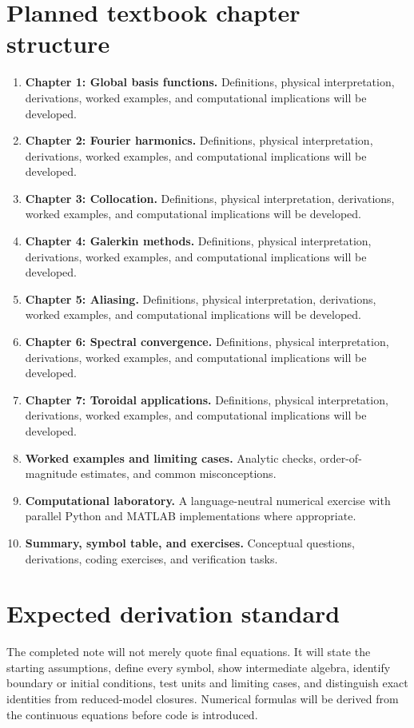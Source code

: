 \documentclass[11pt]{article}
\begin{document}
\section{Planned textbook chapter structure}
\begin{enumerate}[leftmargin=1.8em]
\item \textbf{Chapter 1: Global basis functions.} Definitions, physical interpretation, derivations, worked examples, and computational implications will be developed.
\item \textbf{Chapter 2: Fourier harmonics.} Definitions, physical interpretation, derivations, worked examples, and computational implications will be developed.
\item \textbf{Chapter 3: Collocation.} Definitions, physical interpretation, derivations, worked examples, and computational implications will be developed.
\item \textbf{Chapter 4: Galerkin methods.} Definitions, physical interpretation, derivations, worked examples, and computational implications will be developed.
\item \textbf{Chapter 5: Aliasing.} Definitions, physical interpretation, derivations, worked examples, and computational implications will be developed.
\item \textbf{Chapter 6: Spectral convergence.} Definitions, physical interpretation, derivations, worked examples, and computational implications will be developed.
\item \textbf{Chapter 7: Toroidal applications.} Definitions, physical interpretation, derivations, worked examples, and computational implications will be developed.
\item \textbf{Worked examples and limiting cases.} Analytic checks, order-of-magnitude estimates, and common misconceptions.
\item \textbf{Computational laboratory.} A language-neutral numerical exercise with parallel Python and MATLAB implementations where appropriate.
\item \textbf{Summary, symbol table, and exercises.} Conceptual questions, derivations, coding exercises, and verification tasks.
\end{enumerate}

\section{Expected derivation standard}
The completed note will not merely quote final equations. It will state the starting assumptions, define every symbol, show intermediate algebra, identify boundary or initial conditions, test units and limiting cases, and distinguish exact identities from reduced-model closures. Numerical formulas will be derived from the continuous equations before code is introduced.
\end{document}
